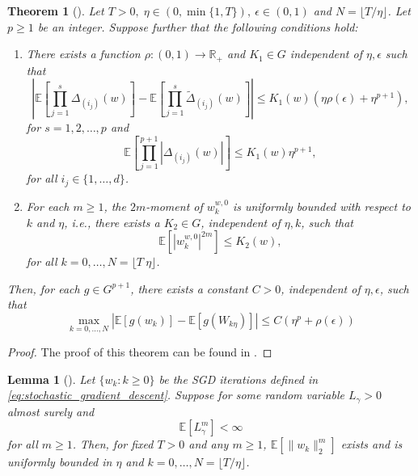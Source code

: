 \documentclass[12pt]{article}
\newtheorem{theorem}{Theorem}[section]
\newtheorem{lemma}[lemma]{Lemma}
\theoremstyle{definition}
\numberwithin{equation}{section}
\newcommand{\R}{\mathbb{R}}
\newcommand{\ev}[1]{\mathbb{E}\left[{#1}\right]}
\newcommand{\norm}[1]{\lVert{#1}\rVert_2}
\begin{document}
\begin{theorem}[]
  \label{thm:approximation}
  Let $T > 0, \; \eta \in (0,\min\{1,T\}), \: \epsilon \in (0,1)$ and $N = \lfloor T / \eta \rfloor$. Let $p \geq 1$ be an integer. Suppose further that the following conditions hold:
  \begin{enumerate}[label=(\roman*)]
    \item There exists a function $\rho : (0,1) \rightarrow \R_+$ and $K_1 \in G$ independent of $\eta, \epsilon$ such that
    \begin{equation*}
      \left\lvert \ev{\prod_{j=1}^s \Delta_{(i_j)}(w)} - \ev{\prod_{j=1}^s \tilde{\Delta}_{(i_j)}(w)}\right\rvert \leq K_1(w)(\eta \rho(\epsilon) + \eta^{p+1}),
    \end{equation*}
    for $s=1,2,\dots,p$ and
    \begin{equation*}
      \ev{\prod_{j=1}^{p+1}\left\lvert \Delta_{(i_j)}(w)\right\rvert} \leq K_1(w)\eta^{p+1},
    \end{equation*}
    for all $i_j \in \{1,\dots,d\}$.
    \item For each $m \geq 1$, the $2m$-moment of $w_k^{w,0}$ is uniformly bounded with respect to $k$ and $\eta$, i.e., there exists a $K_2 \in G$, independent of $\eta, k$, such that
    \begin{equation*}
      \ev{\left\lvert w_k^{w,0} \right\rvert^{2m}} \leq K_2(w),
    \end{equation*}
    for all $k = 0, \dots, N = \lfloor T\ \eta \rfloor$.
  \end{enumerate}
  Then, for each $g \in G^{p + 1}$, there exists a constant $C > 0$, independent of $\eta, \epsilon$, such that
  \begin{equation*}
    \max_{k=0,\dots,N}|\ev{g(w_k)} - \ev{g(W_{k\eta})}|\leq C(\eta^{p} + \rho(\epsilon))
  \end{equation*}
\end{theorem}
\begin{proof}
  The proof of this theorem can be found in \cite{liStochasticModifiedEquations2019}.
\end{proof}
\begin{lemma}[]
  \label{lemma:moment_bound}
  Let $\{w_k: k \geq 0 \}$ be the SGD iterations defined in \eqref{eq:stochastic_gradient_descent}. Suppose for some random variable $L_{\gamma} > 0$ almost surely and 
  \begin{equation*}
    \ev{L_{\gamma}^m} < \infty
  \end{equation*}
  for all $m \geq 1$. Then, for fixed $T > 0$ and any $m \geq 1$, $\ev{\norm{w_k}^m}$ exists and is uniformly bounded in $\eta$ and $k=0,\dots,N = \lfloor T / \eta \rfloor$.
\end{lemma}
\end{document}
